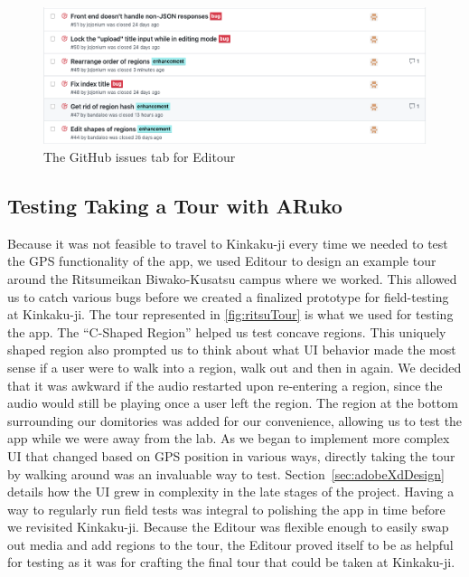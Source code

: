 \documentclass[a4paper, 10pt, american, titlepage]{article}
\begin{document}
\begin{figure}[h]
	\centering
	\includegraphics[width=\textwidth]{issues-page-example.png}
	\caption{The GitHub issues tab for Editour}
	\label{fig:issuesPageExample}
\end{figure}

\subsection{Testing Taking a Tour with ARuko}
\label{sec:testingARuko}

Because it was not feasible to travel to Kinkaku-ji every time we needed to
test the GPS functionality of the app, we used Editour to design an example
tour around the Ritsumeikan Biwako-Kusatsu campus where we worked. This allowed
us to catch various bugs before we created a finalized prototype for
field-testing at Kinkaku-ji. The tour represented in \ref{fig:ritsuTour} is
what we used for testing the app. The ``C-Shaped Region'' helped us test
concave regions. This uniquely shaped region also prompted us to think about
what UI behavior made the most sense if a user were to walk into a region, walk
out and then in again. We decided that it was awkward if the audio restarted
upon re-entering a region, since the audio would still be playing once a user
left the region. The region at the bottom surrounding our domitories was added
for our convenience, allowing us to test the app while we were away from the
lab.  As we began to implement more complex UI that changed based on GPS
position in various ways, directly taking the tour by walking around was an
invaluable way to test. Section~\ref{sec:adobeXdDesign} details how the UI grew
in complexity in the late stages of the project. Having a way to regularly run
field tests was integral to polishing the app in time before we revisited
Kinkaku-ji.  Because the Editour was flexible enough to easily swap out media
and add regions to the tour, the Editour proved itself to be as helpful for
testing as it was for crafting the final tour that could be taken at
Kinkaku-ji.
\end{document}
